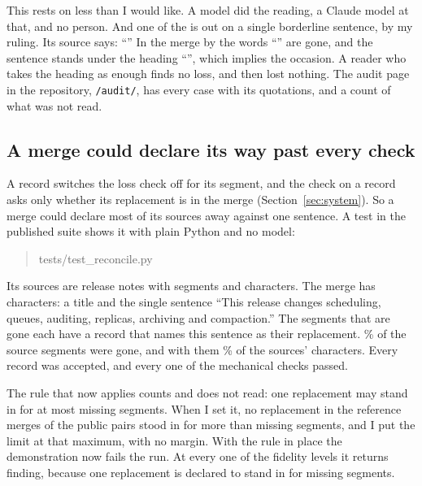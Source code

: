 This rests on less than I would like. A model did the reading, a Claude model at that, and no person. And one of the  is out on a single borderline sentence, by my ruling. Its source says: ``'' In the merge by \texttt{} the words ``'' are gone, and the sentence stands under the heading ``'', which implies the occasion. A reader who takes the heading as enough finds no loss, and then \texttt{} lost nothing. The audit page in the repository, \texttt{/audit/}, has every case with its quotations, and a count of what was not read.

\subsection{A merge could declare its way past every check}
\label{sec:declared-blindspot}

A record switches the loss check off for its segment, and the check on a record asks only whether its replacement is in the merge (Section~\ref{sec:system}). So a merge could declare most of its sources away against one sentence. A test in the published suite shows it with plain Python and no model:

\begin{quote}\small\ttfamily
tests/test\_reconcile.py\\
\end{quote}

\noindent Its sources are release notes with  segments and  characters. The merge has  characters: a title and the single sentence ``This release changes scheduling, queues, auditing, replicas, archiving and compaction.'' The  segments that are gone each have a record that names this sentence as their replacement. \% of the source segments were gone, and with them \% of the sources' characters. Every record was accepted, and every one of the mechanical checks passed.

The rule that now applies counts and does not read: one replacement may stand in for at most  missing segments. When I set it, no replacement in the reference merges of the  public pairs stood in for more than  missing segments, and I put the limit at that maximum, with no margin. With the rule in place the demonstration now fails the run. At every one of the  fidelity levels it returns  finding, because one replacement is declared to stand in for  missing segments.

